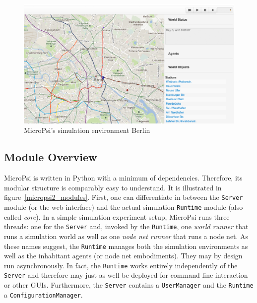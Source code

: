 \begin{figure}[h]
  \centering
    \includegraphics[width=14cm]{graphics/mp2_berlin}
  \caption{MicroPsi's simulation environment Berlin}
  \label{mp2_berlin}
\end{figure}

        \subsection{Module Overview}
        
    

        
MicroPsi is written in Python with a minimum of dependencies. Therefore, its  modular structure is comparably easy to understand. It is illustrated in figure~\ref{micropsi2_modules}. First, one can differentiate in between the \texttt{Server} module (or the web interface) and the actual simulation \texttt{Runtime} module (also called \emph{core}). In a simple simulation experiment setup, MicroPsi runs three threads: one for the \texttt{Server} and, invoked by the \texttt{Runtime}, one \emph{world runner} that runs a simulation world as well as one \emph{node net runner} that runs a node net. As these names suggest, the \texttt{Runtime} manages both the simulation environments as well as the inhabitant agents (or node net embodiments). They may by design run asynchronously. In fact, the \texttt{Runtime} works entirely independently of the \texttt{Server} and therefore may just as well be deployed for command line interaction or other GUIs. Furthermore, the \texttt{Server} contains a \texttt{UserManager} and the \texttt{Runtime} a \texttt{ConfigurationManager}.~\cite{conf/agi/Bach12}
\\          

